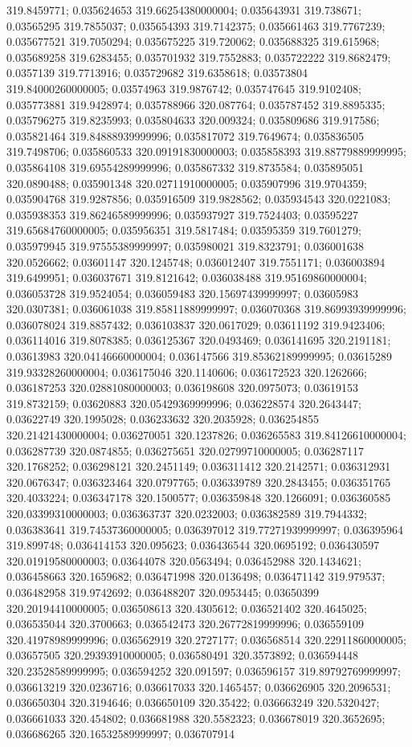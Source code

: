 319.8459771; 0.035624653 319.66254380000004; 0.035643931 319.738671; 0.03565295 319.7855037; 0.035654393 319.7142375; 0.035661463 319.7767239; 0.035677521 319.7050294; 0.035675225 319.720062; 0.035688325 319.615968; 0.035689258 319.6283455; 0.035701932 319.7552883; 0.035722222 319.8682479; 0.0357139 319.7713916; 0.035729682 319.6358618; 0.03573804 319.84000260000005; 0.03574963 319.9876742; 0.035747645 319.9102408; 0.035773881 319.9428974; 0.035788966 320.087764; 0.035787452 319.8895335; 0.035796275 319.8235993; 0.035804633 320.009324; 0.035809686 319.917586; 0.035821464 319.84888939999996; 0.035817072 319.7649674; 0.035836505 319.7498706; 0.035860533 320.09191830000003; 0.035858393 319.88779889999995; 0.035864108 319.69554289999996; 0.035867332 319.8735584; 0.035895051 320.0890488; 0.035901348 320.02711910000005; 0.035907996 319.9704359; 0.035904768 319.9287856; 0.035916509 319.9828562; 0.035934543 320.0221083; 0.035938353 319.86246589999996; 0.035937927 319.7524403; 0.03595227 319.65684760000005; 0.035956351 319.5817484; 0.03595359 319.7601279; 0.035979945 319.97555389999997; 0.035980021 319.8323791; 0.036001638 320.0526662; 0.03601147 320.1245748; 0.036012407 319.7551171; 0.036003894 319.6499951; 0.036037671 319.8121642; 0.036038488 319.95169860000004; 0.036053728 319.9524054; 0.036059483 320.15697439999997; 0.03605983 320.0307381; 0.036061038 319.85811889999997; 0.036070368 319.86993939999996; 0.036078024 319.8857432; 0.036103837 320.0617029; 0.03611192 319.9423406; 0.036114016 319.8078385; 0.036125367 320.0493469; 0.036141695 320.2191181; 0.03613983 320.04146660000004; 0.036147566 319.85362189999995; 0.03615289 319.93328260000004; 0.036175046 320.1140606; 0.036172523 320.1262666; 0.036187253 320.02881080000003; 0.036198608 320.0975073; 0.03619153 319.8732159; 0.03620883 320.05429369999996; 0.036228574 320.2643447; 0.03622749 320.1995028; 0.036233632 320.2035928; 0.036254855 320.21421430000004; 0.036270051 320.1237826; 0.036265583 319.84126610000004; 0.036287739 320.0874855; 0.036275651 320.02799710000005; 0.036287117 320.1768252; 0.036298121 320.2451149; 0.036311412 320.2142571; 0.036312931 320.0676347; 0.036323464 320.0797765; 0.036339789 320.2843455; 0.036351765 320.4033224; 0.036347178 320.1500577; 0.036359848 320.1266091; 0.036360585 320.03399310000003; 0.036363737 320.0232003; 0.036382589 319.7944332; 0.036383641 319.74537360000005; 0.036397012 319.77271939999997; 0.036395964 319.899748; 0.036414153 320.095623; 0.036436544 320.0695192; 0.036430597 320.01919580000003; 0.03644078 320.0563494; 0.036452988 320.1434621; 0.036458663 320.1659682; 0.036471998 320.0136498; 0.036471142 319.979537; 0.036482958 319.9742692; 0.036488207 320.0953445; 0.03650399 320.20194410000005; 0.036508613 320.4305612; 0.036521402 320.4645025; 0.036535044 320.3700663; 0.036542473 320.26772819999996; 0.036559109 320.41978989999996; 0.036562919 320.2727177; 0.036568514 320.22911860000005; 0.03657505 320.29393910000005; 0.036580491 320.3573892; 0.036594448 320.23528589999995; 0.036594252 320.091597; 0.036596157 319.89792769999997; 0.036613219 320.0236716; 0.036617033 320.1465457; 0.036626905 320.2096531; 0.036650304 320.3194646; 0.036650109 320.35422; 0.036663249 320.5320427; 0.036661033 320.454802; 0.036681988 320.5582323; 0.036678019 320.3652695; 0.036686265 320.16532589999997; 0.036707914 